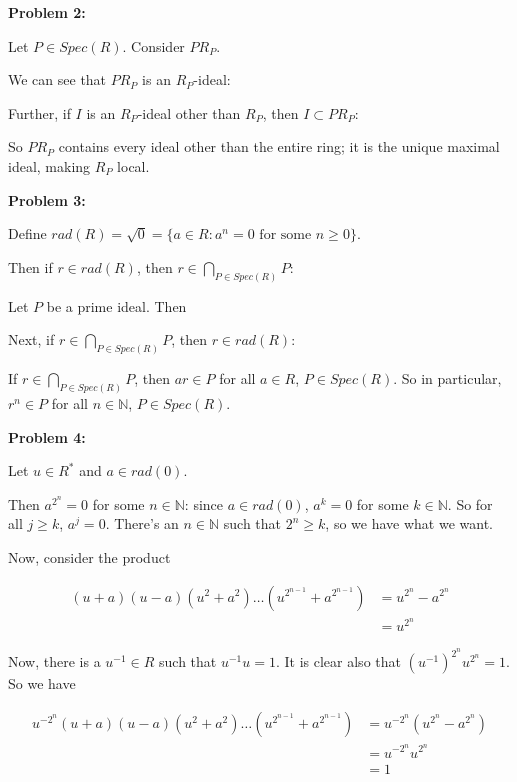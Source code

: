 \documentclass[a4paper,12pt]{article}
\newcommand{\tab}{\hspace{4mm}} %
\newcommand{\shunt}{\vspace{20mm}}
\newcommand{\N}{\mathbb{N}}
\begin{document}
\shunt

{\bf Problem 2:} %

Let $P \in Spec(R)$. Consider $PR_P$.

\tab We can see that $PR_P$ is an $R_P$-ideal: %

\tab Further, if $I$ is an $R_P$-ideal other than $R_P$, then $I \subset PR_P$: %

So $PR_P$ contains every ideal other than the entire ring; it is the unique maximal ideal, making $R_P$ local.

\shunt

{\bf Problem 3:}

Define $rad(R) = \sqrt{0} = \{a \in R: a^n = 0 \text{ for some } n \geq 0\}$.

Then if $r \in rad(R)$, then $r \in \bigcap\limits_{P \in Spec(R)} P$:

\tab Let $P$ be a prime ideal. Then %

Next, if $r \in \bigcap\limits_{P \in Spec(R)} P$, then $r \in rad(R)$:

\tab If $r \in \bigcap\limits_{P \in Spec(R)} P$, then $ar \in P$ for all $a \in R$, $P \in Spec(R)$. So in particular, $r^n \in P$ for all $n \in \N$, $P \in Spec(R)$. 

\shunt

{\bf Problem 4:} %

Let $u \in R^*$ and $a \in rad(0)$.

Then $a^{2^n} = 0$ for some $n \in \N$: since $a \in rad(0)$, $a^k = 0$ for some $k \in \N$. So for all $j \geq k$, $a^j = 0$. There's an $n \in \N$ such that $2^n \geq k$, so we have what we want.

Now, consider the product

\begin{align*}
(u+a)(u-a)(u^2+a^2)\ldots(u^{2^{n-1}}+a^{2^{n-1}}) &= u^{2^n} - a^{2^n}\\
&=u^{2^n}
\end{align*}

Now, there is a $u^{-1} \in R$ such that $u^{-1}u=1$. It is clear also that $(u^{-1})^{2^n}u^{2^n} = 1$. So we have

\begin{align*}
u^{-2^n}(u+a)(u-a)(u^2+a^2)\ldots(u^{2^{n-1}}+a^{2^{n-1}}) &= u^{-2^n}(u^{2^n} - a^{2^n})\\
&=u^{-2^n}u^{2^n}\\
&=1
\end{align*}
\end{document}
